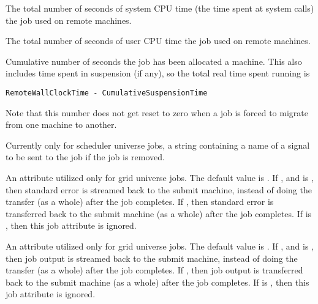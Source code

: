 \begin{description}
\item[\AdAttr{RemoteSysCpu}:]  The total number of seconds
of system CPU time (the time spent at system calls) the job used
on remote machines.

\item[\AdAttr{RemoteUserCpu}:]  The total number of seconds
of user CPU time the job used on remote machines.

\label{RemoteWallClockTime}
\item[\AdAttr{RemoteWallClockTime}:]  Cumulative number of seconds
the job has been allocated a machine.
This also includes time spent in suspension (if any),
so the total real time spent running is 
\begin{verbatim}
RemoteWallClockTime - CumulativeSuspensionTime
\end{verbatim}
Note that this number does not get reset to
zero when a job is forced to migrate from one machine to another.

\item[\AdAttr{RemoveKillSig}:]    Currently only for scheduler universe jobs,
a string containing a name of
a signal to be sent to the job if the job is removed.

\item[\AdAttr{StreamErr}:]   
An attribute utilized only for grid universe jobs.
The default value is .
If , and  is , then 
standard error is streamed back to the submit machine, instead
of doing the transfer (as a whole) after the job completes.
If , then
standard error is transferred back to the submit machine
(as a whole) after the job completes.
If  is , then this job attribute is ignored.

\item[\AdAttr{StreamOut}:]   
An attribute utilized only for grid universe jobs.
The default value is .
If , and  is , then 
job output is streamed back to the submit machine, instead
of doing the transfer (as a whole) after the job completes.
If , then
job output is transferred back to the submit machine
(as a whole) after the job completes.
If  is , then this job attribute is ignored.


\end{description}
